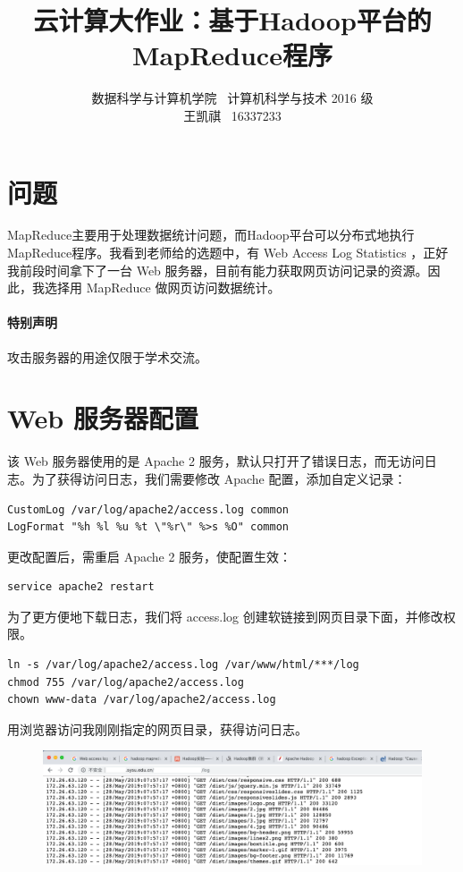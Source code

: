 \documentclass{article}
\begin{document}
\title{云计算大作业：基于Hadoop平台的MapReduce程序}
\author {数据科学与计算机学院 \ 计算机科学与技术 2016 级 \\ 王凯祺 \ 16337233}
\maketitle

\section{问题}

MapReduce主要用于处理数据统计问题，而Hadoop平台可以分布式地执行MapReduce程序。我看到老师给的选题中，有 Web Access Log Statistics ，正好我前段时间拿下了一台 Web 服务器，目前有能力获取网页访问记录的资源。因此，我选择用 MapReduce 做网页访问数据统计。

\paragraph{特别声明} 攻击服务器的用途仅限于学术交流。

\section{Web 服务器配置}

该 Web 服务器使用的是 Apache 2 服务，默认只打开了错误日志，而无访问日志。为了获得访问日志，我们需要修改 Apache 配置，添加自定义记录：

\begin{lstlisting}
CustomLog /var/log/apache2/access.log common
LogFormat "%h %l %u %t \"%r\" %>s %O" common
\end{lstlisting}

更改配置后，需重启 Apache 2 服务，使配置生效：

\begin{lstlisting}
service apache2 restart
\end{lstlisting}

为了更方便地下载日志，我们将 access.log 创建软链接到网页目录下面，并修改权限。

\begin{lstlisting}
ln -s /var/log/apache2/access.log /var/www/html/***/log
chmod 755 /var/log/apache2/access.log
chown www-data /var/log/apache2/access.log
\end{lstlisting}

用浏览器访问我刚刚指定的网页目录，获得访问日志。

\begin{figure}[!ht]
\centering
\includegraphics[scale=0.32]{image/4.png}
\end{figure}
\end{document}
